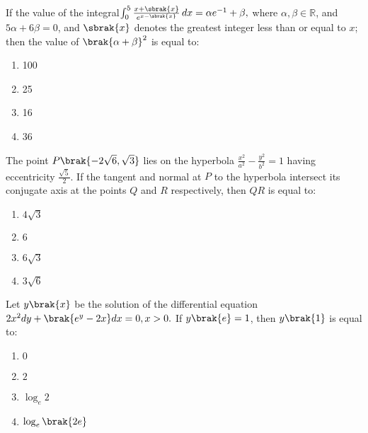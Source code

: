 \item If the value of the integral$\int_0^5 \frac{x + \sbrak{x} }{e^{x - \sbrak{ x }}} \, dx = \alpha e^{-1} + \beta,$ where $\alpha, \beta \in \mathbb{R}$, and $5\alpha + 6\beta = 0$, and $\sbrak{ x }$ denotes the greatest integer less than or equal to $x$; then the value of $\brak{\alpha + \beta}^2$ is equal to: \hfill {}

\begin{multicols}{4}    
\begin{enumerate}
    \item 100
    \item 25
    \item 16
    \item 36
\end{enumerate}
\end{multicols}


\item The point $P\brak{-2\sqrt{6}, \sqrt{3}}$ lies on the hyperbola $\frac{x^2}{a^2} - \frac{y^2}{b^2} = 1$ having eccentricity $\frac{\sqrt{5}}{2}$. If the tangent and normal at $P$ to the hyperbola intersect its conjugate axis at the points $Q$ and $R$ respectively, then $QR$ is equal to:  \hfill {}
\begin{multicols}{4}
\begin{enumerate}
    \item $4\sqrt{3}$
    \item $6$
    \item $6\sqrt{3}$
    \item $3\sqrt{6}$
\end{enumerate}
\end{multicols}


 \item Let $y\brak{x}$ be the solution of the differential equation $2x^2dy + \brak{e^y - 2x}dx =0,  x > 0.$
If $y\brak{e} = 1$, then $y\brak{1}$ is equal to:  \hfill {}
\begin{multicols}{4}    
\begin{enumerate}
    \item $0$
    \item $2$
    \item $\log_e2$
    \item $\log_e\brak{2e}$
\end{enumerate}
\end{multicols}


